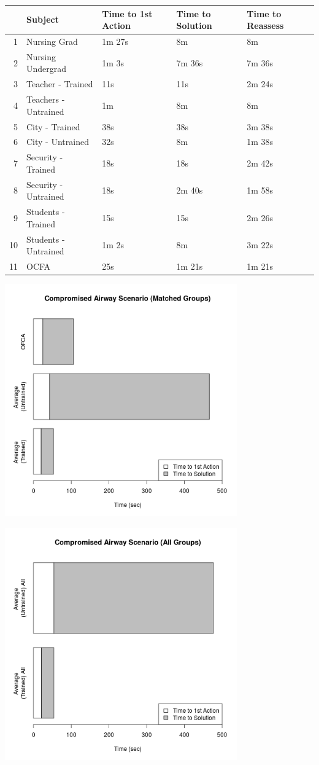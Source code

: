 \documentclass{article}
\begin{document}
\begin{table}[ht]
\centering
\begin{tabular}{rllll}
  \hline
 & Subject & Time to 1st Action & Time to Solution & Time to Reassess \\
  \hline
1 & Nursing Grad & 1m 27s & 8m & 8m \\
  2 & Nursing Undergrad & 1m 3s & 7m 36s & 7m 36s \\
  3 & Teacher - Trained & 11s & 11s & 2m 24s \\
  4 & Teachers - Untrained & 1m & 8m & 8m \\
  5 & City - Trained & 38s & 38s & 3m 38s \\
  6 & City - Untrained & 32s & 8m & 1m 38s \\
  7 & Security - Trained & 18s & 18s & 2m 42s \\
  8 & Security - Untrained & 18s & 2m 40s & 1m 58s \\
  9 & Students - Trained & 15s & 15s & 2m 26s \\
  10 & Students - Untrained & 1m 2s & 8m & 3m 22s \\
  11 & OCFA & 25s & 1m 21s & 1m 21s \\
   \hline
\end{tabular}
\end{table}

\centering
\includegraphics[width = 10cm]{Airway_Plot1.png}

\centering
\includegraphics[width = 10cm]{Airway_Plot2.png}
\end{document}
